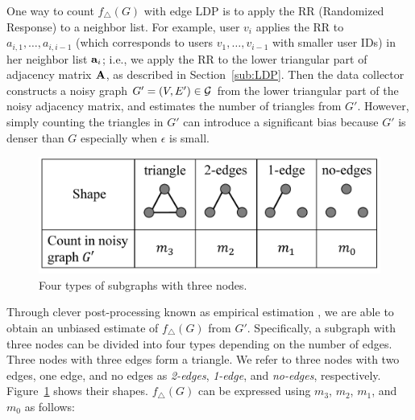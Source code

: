 One way to count $f_\triangle(G)$ with edge LDP is 
to apply the RR (Randomized Response) 
to a neighbor list. 
For example, user $v_i$ applies the RR to 
$a_{i,1}, \ldots, a_{i,i-1}$ (which corresponds to users $v_1, \ldots, v_{i-1}$ with smaller user IDs) in her neighbor list $\mathbf{a}_i$; i.e., 
we apply the RR to the lower triangular part of adjacency matrix $\mathbf{A}$, as described in Section~\ref{sub:LDP}. 
Then the data collector constructs a noisy graph $G'=(V,E') \in \mathcal{G}$ from the lower triangular part of the noisy adjacency matrix, and 
estimates the number of triangles 
from $G'$. 
However, 
simply counting
the triangles in 
$G'$ 
can introduce a significant bias 
because $G'$ is denser than $G$ especially when $\epsilon$ is small. 

\begin{figure}
\centering
\includegraphics[width=0.9\linewidth]{fig/triplet_shape.pdf}
\vspace{-4mm}
\caption{Four types of subgraphs with three nodes.}
\label{fig:triplet_shape}
\end{figure}

Through 
clever post-processing 
known as 
empirical estimation 
\cite{Kairouz_ICML16,Murakami_USENIX19,Wang_USENIX17},
we are able to obtain an unbiased estimate of $f_\triangle(G)$ 
from $G'$. 
Specifically, a subgraph with three nodes can be divided into four types depending on the number of edges. 
Three nodes with three edges form a triangle. 
We refer to three nodes with two edges, one edge, and no edges as \textit{2-edges},  \textit{1-edge}, and  \textit{no-edges}, respectively. 
Figure~\ref{fig:triplet_shape} shows their shapes. 
$f_\triangle(G)$ can be expressed using $m_3$, $m_2$, $m_1$, and $m_0$ as follows:

